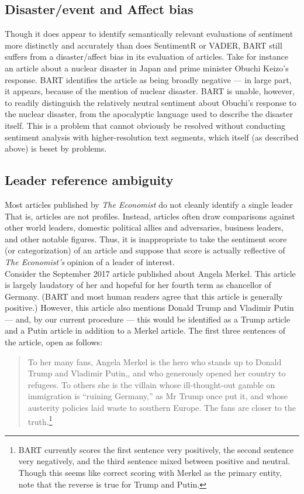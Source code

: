 \documentclass[11pt, letterpaper, twoside]{article}
\begin{document}
    \subsection{Disaster/event and Affect bias}
        Though it does appear to identify semantically relevant evaluations of sentiment more distinctly and accurately than does SentimentR or VADER, BART still suffers from a disaster/affect bias in its evaluation of articles. Take for instance an article about a nuclear disaster in Japan and prime minister Obuchi Keizo's response. BART identifies the article as being broadly negative --- in large part, it appears, because of the mention of nuclear disaster. BART is unable, however, to readily distinguish the relatively neutral sentiment about Obuchi's response to the nuclear disaster, from the apocalyptic language used to describe the disaster itself. This is a problem that cannot obviously be resolved without conducting sentiment analysis with higher-resolution text segments, which itself (as described above) is beset by problems.

    \subsection{Leader reference ambiguity}
        Most articles published by \textit{The Economist} do not cleanly identify a single leader That is, articles are not profiles. Instead, articles often draw comparisons against other world leaders, domestic political allies and adversaries, business leaders, and other notable figures. Thus, it is inappropriate to take the sentiment score (or categorization) of an article and suppose that score is actually reflective of \textit{The Economist's} opinion of a leader of interest.\\

        Consider the September 2017 article published about Angela Merkel. This article is largely laudatory of her and hopeful for her fourth term as chancellor of Germany. (BART and most human readers agree that this article is generally positive.) However, this article also mentions Donald Trump and Vladimir Putin  --- and, by our current procedure --- this would be identified as a Trump article and a Putin article in addition to a Merkel article. The first three sentences of the article, open as follows:

        \begin{quote}
            To her many fans, Angela Merkel is the hero who stands up to Donald Trump and Vladimir Putin,, and who generously opened her country to refugees. To others she is the villain whose ill-thought-out gamble on immigration is ``ruining Germany,'' as Mr Trump once put it, and whose austerity policies laid waste to southern Europe. The fans are closer to the truth.\footnote{BART currently scores the first sentence very positively, the second sentence very negatively, and the third sentence mixed between positive and neutral. Though this seems like correct scoring with Merkel as the primary entity, note that the reverse is true for Trump and Putin.}
        \end{quote}
\end{document}
